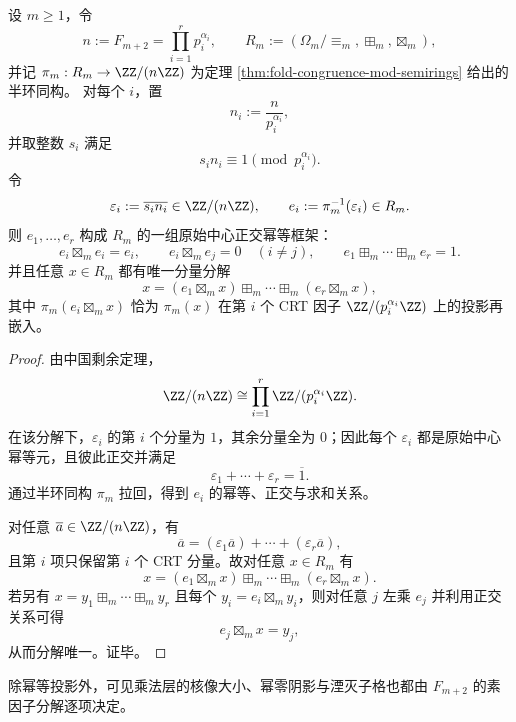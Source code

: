 \begin{corollary}\label{cor:fold-mod-semirings-crt-orthogonal-frame}
设 \(m\ge 1\)，令
\[
n:=F_{m+2}=\prod_{i=1}^r p_i^{\alpha_i},
\qquad
R_m:=(\Omega_m/\!\equiv_m,\boxplus_m,\boxtimes_m),
\]
并记 \(\pi_m:R_m\to \ZZ/(n\ZZ)\) 为定理 \ref{thm:fold-congruence-mod-semirings} 给出的半环同构。
对每个 \(i\)，置
\[
n_i:=\frac{n}{p_i^{\alpha_i}},
\]
并取整数 \(s_i\) 满足
\[
s_i n_i\equiv 1\pmod{p_i^{\alpha_i}}.
\]
令
\[
\varepsilon_i:=\overline{s_i n_i}\in \ZZ/(n\ZZ),
\qquad
e_i:=\pi_m^{-1}(\varepsilon_i)\in R_m.
\]
则 \(e_1,\dots,e_r\) 构成 \(R_m\) 的一组原始中心正交幂等框架：
\[
e_i\boxtimes_m e_i=e_i,
\qquad
e_i\boxtimes_m e_j=0\quad(i\neq j),
\qquad
e_1\boxplus_m\cdots\boxplus_m e_r=1.
\]
并且任意 \(x\in R_m\) 都有唯一分量分解
\[
x=(e_1\boxtimes_m x)\boxplus_m\cdots\boxplus_m(e_r\boxtimes_m x),
\]
其中 \(\pi_m(e_i\boxtimes_m x)\) 恰为 \(\pi_m(x)\) 在第 \(i\) 个 CRT 因子 \(\ZZ/(p_i^{\alpha_i}\ZZ)\) 上的投影再嵌入。
\end{corollary}
\begin{proof}
由中国剩余定理，
\[
\ZZ/(n\ZZ)\cong \prod_{i=1}^r \ZZ/(p_i^{\alpha_i}\ZZ).
\]
在该分解下，\(\varepsilon_i\) 的第 \(i\) 个分量为 \(1\)，其余分量全为 \(0\)；因此每个 \(\varepsilon_i\) 都是原始中心幂等元，且彼此正交并满足
\[
\varepsilon_1+\cdots+\varepsilon_r=\overline 1.
\]
通过半环同构 \(\pi_m\) 拉回，得到 \(e_i\) 的幂等、正交与求和关系。

对任意 \(\overline a\in \ZZ/(n\ZZ)\)，有
\[
\overline a=(\varepsilon_1\overline a)+\cdots+(\varepsilon_r\overline a),
\]
且第 \(i\) 项只保留第 \(i\) 个 CRT 分量。故对任意 \(x\in R_m\) 有
\[
x=(e_1\boxtimes_m x)\boxplus_m\cdots\boxplus_m(e_r\boxtimes_m x).
\]
若另有 \(x=y_1\boxplus_m\cdots\boxplus_m y_r\) 且每个 \(y_i=e_i\boxtimes_m y_i\)，则对任意 \(j\) 左乘 \(e_j\) 并利用正交关系可得
\[
e_j\boxtimes_m x=y_j,
\]
从而分解唯一。证毕。
\end{proof}

除幂等投影外，可见乘法层的核像大小、幂零阴影与湮灭子格也都由 \(F_{m+2}\) 的素因子分解逐项决定。

